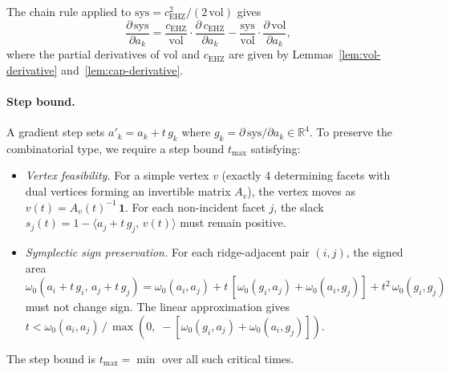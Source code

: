 \begin{unverified}
\begin{corollary}
\label{cor:sys-derivative}
The chain rule applied to
$\mathrm{sys} = c_{\mathrm{EHZ}}^2 / (2\,\mathrm{vol})$ gives
\[
  \frac{\partial\,\mathrm{sys}}{\partial a_k}
  = \frac{c_{\mathrm{EHZ}}}{\mathrm{vol}}
    \cdot \frac{\partial\,c_{\mathrm{EHZ}}}{\partial a_k}
  - \frac{\mathrm{sys}}{\mathrm{vol}}
    \cdot \frac{\partial\,\mathrm{vol}}{\partial a_k},
\]
where the partial derivatives of $\mathrm{vol}$ and $c_{\mathrm{EHZ}}$ are
given by Lemmas~\ref{lem:vol-derivative} and~\ref{lem:cap-derivative}.
\end{corollary}
\end{unverified}

\begin{unverified}
\paragraph{Step bound.}
A gradient step sets $a'_k = a_k + t\,g_k$ where
$g_k = \partial\,\mathrm{sys}/\partial a_k \in \mathbb{R}^4$.
To preserve the combinatorial type, we require a step bound
$t_{\max}$ satisfying:
\begin{itemize}
\item \emph{Vertex feasibility.}
  For a simple vertex $v$ (exactly 4 determining facets with dual vertices
  forming an invertible matrix $A_v$), the vertex moves as
  $v(t) = A_v(t)^{-1}\,\mathbf{1}$.
  For each non-incident facet $j$, the slack
  $s_j(t) = 1 - \langle a_j + t\,g_j,\, v(t) \rangle$
  must remain positive.

\item \emph{Symplectic sign preservation.}
  For each ridge-adjacent pair $(i,j)$, the signed area
  $\omega_0(a_i + t\,g_i,\, a_j + t\,g_j)
  = \omega_0(a_i,a_j) + t\,[\omega_0(g_i,a_j) + \omega_0(a_i,g_j)] + t^2\,\omega_0(g_i,g_j)$
  must not change sign.
  The linear approximation gives
  $t < \omega_0(a_i,a_j)\,/\,\max(0,\;-[\omega_0(g_i,a_j) + \omega_0(a_i,g_j)])$.
\end{itemize}
The step bound is $t_{\max} = \min$ over all such critical times.
\end{unverified}

